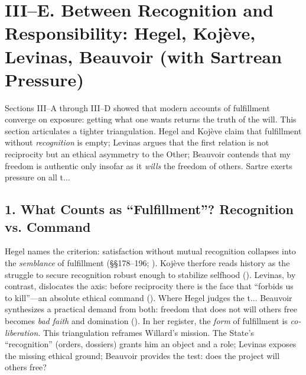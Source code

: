 \section*{III--E. Between Recognition and Responsibility: Hegel, Koj{\`e}ve, Levinas, Beauvoir (with Sartrean Pressure)}
\label{sec:iii-e-between-recognition-and-responsibility-hegel-koj-e-ve-levinas-beauvoir-with-sartrean-pressure}

Sections III--A through III--D showed that modern accounts of fulfillment converge on exposure: getting what one wants returns the truth of the will. This section articulates a tighter triangulation. Hegel and Koj{\`e}ve claim that fulfillment without \emph{recognition} is empty; Levinas argues that the first relation is not reciprocity but an ethical asymmetry to the Other; Beauvoir contends that my freedom is authentic only insofar as it \emph{wills} the freedom of others. Sartre exerts pressure on all t...
\subsection*{1. What Counts as ``Fulfillment''? Recognition vs. Command}
\label{ssec:1-what-counts-as-fulfillment-recognition-vs-command}
Hegel names the criterion: satisfaction without mutual recognition collapses into the \emph{semblance} of fulfillment (\S\S 178--196; \parencite{HegelPhenomenology1977}). Koj{\`e}ve therfore reads history as the struggle to secure recognition robust enough to stabilize selfhood (\parencite{KojeveIRH1980}). Levinas, by contrast, dislocates the axis: before reciprocity there is the face that ``forbids us to kill''---an absolute ethical command (\parencite[p.~199]{LevinasTI1969}). Where Hegel judges the t...
Beauvoir synthesizes a practical demand from both: freedom that does not will others free becomes \emph{bad faith} and domination (\parencite[p.~73]{Beauvoir1976}). In her register, the \emph{form} of fulfillment is \emph{co-liberation}. This triangulation reframes Willard’s mission. The State’s ``recognition'' (orders, dossiers) grants him an object and a role; Levinas exposes the missing ethical ground; Beauvoir provides the test: does the project will others free?

